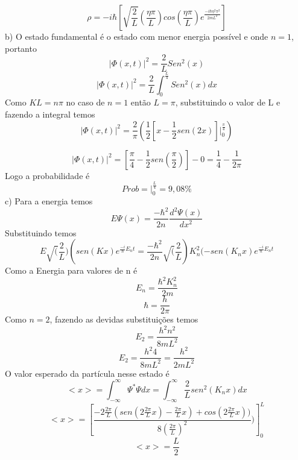 \documentclass{article}
\begin{document}
\begin{equation}
    {\rho = -i\hbar \left[\sqrt{\frac{2}{L}}(\frac{ \eta \pi}{L})cos(\frac{ \eta \pi}{L})e^{\frac{-i\hbar\eta^{2}\pi ^{2}}{2mL^{2}}}\right]}
\end{equation}
\hfill \break
b) O estado fundamental é o estado com menor energia possível e onde $n=1$, portanto 
\begin{equation}
    {|\Phi(x,t)|^{2} = \frac{2}{L}Sen^{2}(x)}
\end{equation}
\begin{equation}
    {|\Phi(x,t)|^{2} = \frac{2}{L} \int_0^{\frac{L}{4}}  Sen^{2}(x)dx}
\end{equation}
Como $KL = n\pi$ no caso de $n=1$ então $L=\pi$, substituindo o valor de L e fazendo a integral temos
\begin{equation}
    {|\Phi(x,t)|^{2} = \frac{2}{\pi} \left(\frac{1}{2} \left[ x - \frac{1}{2} sen(2x) \right]\Big|_0^{\frac{\pi}{4}} \right)}
\end{equation}

\begin{equation}
    {|\Phi(x,t)|^{2} = \left[ \frac{\pi}{4}  - \frac{1}{2} sen(\frac{\pi}{2}) \right] - 0 = \frac{1}{4} - \frac{1}{2\pi}}
\end{equation}
Logo a probabilidade é 
\begin{equation}
    {Prob = \Big|_0^{\frac{L}{4}} = 9,08 \%}
\end{equation}
c) Para a energia temos 
\begin{equation}
    {E \Psi(x)  =  \frac{-\hbar^{2}}{2n}\frac{d^{2}\Psi (x)}{dx^{2}}}
\end{equation}
Substituindo temos
\begin{equation}
    {E \sqrt(\frac{2}{L})(sen(Kx) e^{ \frac{-i}{\hbar}E_n t} =  \frac{-\hbar^{2}}{2n}\sqrt(\frac{2}{L})K_n^{2}(-sen(K_n x) e^{ \frac{-i}{\hbar}E_n t}}
\end{equation}
Como a Energia para valores de n é 
\begin{equation}
    {E_n = \frac{\hbar^{2}K_n^{2}}{2m} }
\end{equation}
\begin{equation}
    {\hbar = \frac{h}{2\pi} }
\end{equation}
Como $n = 2$, fazendo as devidas substituições temos
\begin{equation}
    {E_2 = \frac{h^{2}n^{2}}{8mL^{2}}}
\end{equation}
\begin{equation}
    {E_2 = \frac{h^{2}4}{8mL^{2}} = \frac{h^{2}}{2mL^{2}} }
\end{equation}
O valor esperado da partícula nesse estado é 
\begin{equation}
    {<x> =  \int_{-\infty}^{\infty}  \Psi^{*} \Psi dx = \int_{-\infty}^{\infty}  \frac{2}{L} sen^{2}(K_n x) dx }
\end{equation}
\begin{equation}
    {<x> =  \left[ \frac{-2\frac{2\pi}{L} (sen(2\frac{2\pi}{L}x) - \frac{2\pi}{L}x) + cos(2\frac{2\pi}{L}x))}{8 (\frac{2\pi}{L})^{2}}) \right]_0^L}
\end{equation}
\begin{equation}
    {<x> = \frac{L}{2} }
\end{equation}
\end{document}
